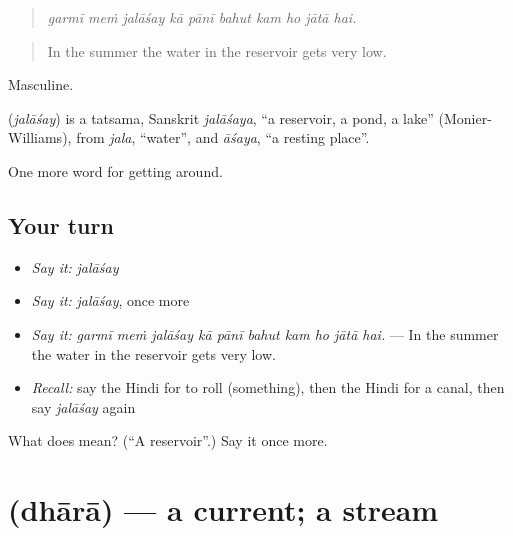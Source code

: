 \begin{quote}
         
\end{quote}

\begin{quote}
\emph{garmī meṁ jalāśay kā pānī bahut kam ho jātā hai.}
\end{quote}

\begin{quote}
In the summer the water in the reservoir gets very low.
\end{quote}

Masculine.

\begin{cousinweb}
\textbf{} (\emph{jalāśay}) is a tatsama, Sanskrit \emph{jalāśaya}, \textquotedblleft{}a reservoir, a pond, a lake\textquotedblright{} (Monier-Williams), from \emph{jala}, \textquotedblleft{}water\textquotedblright{}, and \emph{āśaya}, \textquotedblleft{}a resting place\textquotedblright{}.
\end{cousinweb}

\begin{grammarlens}[title={What you've built}]
One more word for getting around.
\end{grammarlens}

\subsection*{Your turn}
\begin{itemize}
\raggedright
  \item \emph{Say it:} \emph{jalāśay}
  \item \emph{Say it:} \emph{jalāśay}, once more
  \item \emph{Say it:} \emph{garmī meṁ jalāśay kā pānī bahut kam ho jātā hai.} — In the summer the water in the reservoir gets very low.
  \item \emph{Recall:} say the Hindi for to roll (something), then the Hindi for a canal, then say \emph{jalāśay} again
\end{itemize}

\begin{tcolorbox}[breakable,colback=teal!4,colframe=teal!35!black,title={Before you move on}]
What does  mean? (\textquotedblleft{}A reservoir\textquotedblright{}.) Say it once more.
\end{tcolorbox}
\section[\texorpdfstring{\hi{धारा} (dhārā)}{धारा (dhārā)}]{ (dhārā) — a current; a stream}

